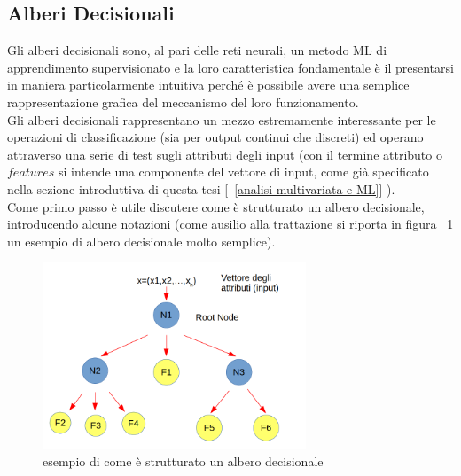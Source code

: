 \newpage

\subsection{Alberi Decisionali}
\label{alberi decisionali}
Gli alberi decisionali sono, al pari delle reti neurali, un metodo ML di apprendimento supervisionato e  la loro caratteristica fondamentale è il presentarsi in maniera particolarmente intuitiva perché è possibile avere una semplice rappresentazione grafica del meccanismo del loro funzionamento.\\
Gli alberi decisionali rappresentano un mezzo estremamente interessante per le operazioni di classificazione (sia per output continui che discreti) ed operano attraverso una serie di test sugli attributi degli input (con il termine attributo o $\textit{features}$ si intende una componente del vettore di input, come già specificato nella sezione introduttiva di questa tesi [~\ref{analisi multivariata e ML}] ). \\ 
Come primo passo è utile discutere come è strutturato un albero decisionale, introducendo alcune notazioni (come ausilio alla trattazione si riporta in figura ~\ref{schemaDT} un esempio di albero decisionale molto semplice). \\

\begin{figure} [h!]
	\centering
	\includegraphics[width=0.70\textwidth]{figs/schemaDT.png}
	\caption{esempio di come è strutturato un albero decisionale}
	\label{schemaDT}
\end{figure} 

